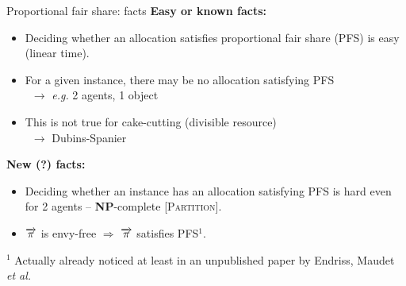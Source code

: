 \documentclass[9pt,english]{beamer}
\begin{document}
\begin{frame}{Proportional fair share: facts}
  \textbf{Easy or known facts:}
  \begin{itemize}
  \item Deciding whether an allocation satisfies proportional fair
    share (PFS) is easy (linear time).
  \item For a given instance, there may be no allocation satisfying
    PFS\\
    \ \hfill $\to$ \textit{e.g.} 2 agents, 1 object
  \item This is not true for cake-cutting (divisible resource)\\
    \ \hfill$\to$ Dubins-Spanier
  \end{itemize}

  \pause\vfill

  \textbf{New (?) facts:}
  \begin{itemize}
  \item Deciding whether an instance has an allocation satisfying PFS
    is hard even for 2 agents -- \textbf{NP}-complete
    [\textsc{Partition}].
  \item $\overrightarrow{\pi}$ is envy-free $\Rightarrow$ $\overrightarrow{\pi}$ satisfies
    PFS$^{\text{1}}$.
  \end{itemize}
  {\scriptsize $^{\text{1}}$ Actually already noticed at least in an
    unpublished paper by Endriss, Maudet \textit{et al.}}

  \pause\vfill
  
  \begin{center}
  \end{center}
\end{frame}
\end{document}
